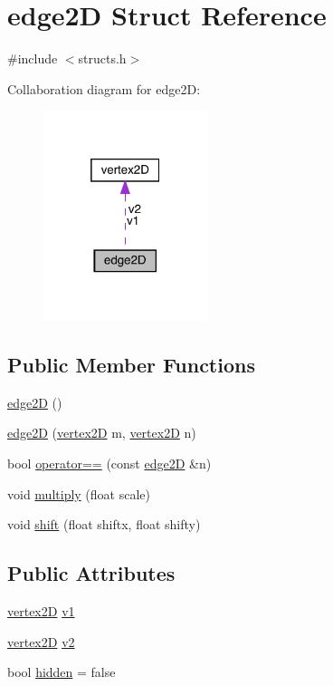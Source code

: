 \hypertarget{structedge2_d}{}\section{edge2D Struct Reference}
\label{structedge2_d}


{\ttfamily \#include $<$structs.\+h$>$}



Collaboration diagram for edge2D\+:
\nopagebreak
\begin{figure}[H]
\begin{center}
\leavevmode
\includegraphics[width=136pt]{structedge2_d__coll__graph}
\end{center}
\end{figure}
\subsection*{Public Member Functions}
\begin{DoxyCompactItemize}
\item 
\mbox{\hyperlink{structedge2_d_abac488760a745ba14a5a0c17693ed3e6}{edge2D}} ()
\item 
\mbox{\hyperlink{structedge2_d_a95676d1bf3e35fbae3ce28a9497c643c}{edge2D}} (\mbox{\hyperlink{structvertex2_d}{vertex2D}} m, \mbox{\hyperlink{structvertex2_d}{vertex2D}} n)
\item 
bool \mbox{\hyperlink{structedge2_d_a305a36218549a8085aca0230ff0cffbc}{operator==}} (const \mbox{\hyperlink{structedge2_d}{edge2D}} \&n)
\item 
void \mbox{\hyperlink{structedge2_d_a5515c7774d5897b9663f2989506023a1}{multiply}} (float scale)
\item 
void \mbox{\hyperlink{structedge2_d_ac22d99c7d0e394a4575b098e79c60ade}{shift}} (float shiftx, float shifty)
\end{DoxyCompactItemize}
\subsection*{Public Attributes}
\begin{DoxyCompactItemize}
\item 
\mbox{\hyperlink{structvertex2_d}{vertex2D}} \mbox{\hyperlink{structedge2_d_ad1d0c2a78bb1b917fc205d94b532111a}{v1}}
\item 
\mbox{\hyperlink{structvertex2_d}{vertex2D}} \mbox{\hyperlink{structedge2_d_ade974e5430928f0a5946820852220717}{v2}}
\item 
bool \mbox{\hyperlink{structedge2_d_a4c16cb9e65f46f54984e53d55ee789b2}{hidden}} = false
\end{DoxyCompactItemize}


